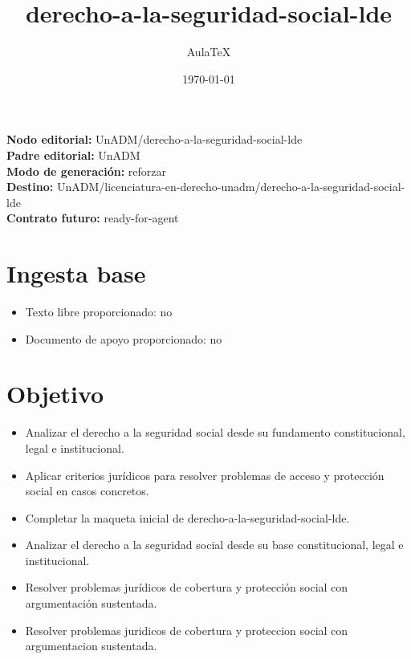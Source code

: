 \documentclass[12pt]{article}
\title{derecho-a-la-seguridad-social-lde}
\author{AulaTeX}
\date{\today}
\begin{document}
\maketitle

\noindent\textbf{Nodo editorial:} UnADM/derecho-a-la-seguridad-social-lde\\
\textbf{Padre editorial:} UnADM\\
\textbf{Modo de generación:} reforzar\\
\textbf{Destino:} UnADM/licenciatura-en-derecho-unadm/derecho-a-la-seguridad-social-lde\\
\textbf{Contrato futuro:} ready-for-agent

\section*{Ingesta base}
\begin{itemize}[leftmargin=*]
  \item Texto libre proporcionado: no
  \item Documento de apoyo proporcionado: no
\end{itemize}

\section*{Objetivo}
\begin{itemize}[leftmargin=*]
  \item Analizar el derecho a la seguridad social desde su fundamento constitucional, legal e institucional.
  \item Aplicar criterios jurídicos para resolver problemas de acceso y protección social en casos concretos.
  \item Completar la maqueta inicial de derecho-a-la-seguridad-social-lde.
  \item Analizar el derecho a la seguridad social desde su base constitucional, legal e institucional.
  \item Resolver problemas jurídicos de cobertura y protección social con argumentación sustentada.
  \item Resolver problemas juridicos de cobertura y proteccion social con argumentacion sustentada.
\end{itemize}
\end{document}
